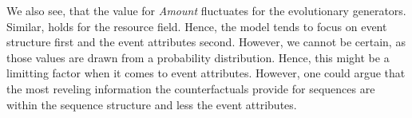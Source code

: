 \documentclass[./../../paper.tex]{subfiles}
\begin{document}
%     
    
%     
    

We also see, that the value for \emph{Amount} fluctuates for the evolutionary generators. Similar, holds for the resource field. Hence, the model tends to focus on event structure first and the event attributes second. However, we cannot be certain, as those values are drawn from a probability distribution. Hence, this might be a limitting factor when it comes to event attributes. However, one could argue that the most reveling information the counterfactuals provide for sequences are within the sequence structure and less the event attributes. 





\end{document}
